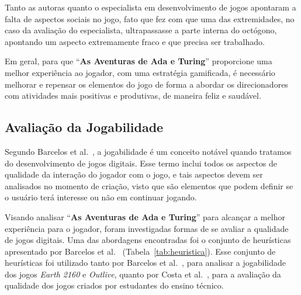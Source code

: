 Tanto as autoras quanto o especialista em desenvolvimento de jogos apontaram a falta de aspectos sociais no jogo, fato que fez com que uma das extremidades, no caso da avaliação do especialista, ultrapassasse a parte interna do octógono, apontando um aspecto extremamente fraco e que precisa ser trabalhado.

Em geral, para que “\textbf{As Aventuras de Ada e Turing}” proporcione uma melhor experiência ao jogador, com uma estratégia gamificada, é necessário melhorar e repensar os elementos do jogo de forma a abordar os direcionadores com atividades mais positivas e produtivas, de maneira feliz e saudável.

\subsection{Avaliação da Jogabilidade} \label{ssec:avaliacao_jogabilidade}

Segundo Barcelos et al.~\cite{barcelos_alise_2011}, a jogabilidade é um conceito notável quando tratamos do desenvolvimento de jogos digitais. Esse termo inclui todos os aspectos de qualidade da interação do jogador com o jogo, e tais aspectos devem ser analisados no momento de criação, visto que são elementos que podem definir se o usuário terá interesse ou não em continuar jogando.

Visando analisar “\textbf{As Aventuras de Ada e Turing}” para alcançar a melhor experiência para o jogador, foram investigadas formas de se avaliar a qualidade de jogos digitais. Uma das abordagens encontradas foi o conjunto de heurísticas apresentado por Barcelos et al.~\cite{barcelos_alise_2011} (Tabela~\ref{tab:heuristica}). Esse conjunto de heurísticas foi utilizado tanto por Barcelos et al.~\cite{barcelos_alise_2011}, para analisar a jogabilidade dos jogos \textit{Earth 2160} e \textit{Outlive}, quanto por Costa et al.~\cite{costa_construindo_2013}, para a avaliação da qualidade dos jogos criados por estudantes do ensino técnico.

